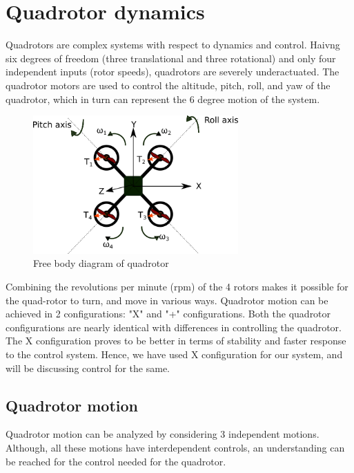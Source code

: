 \documentclass[hidelinks,BTech]{iitmdiss}
\begin{document}
\section{Quadrotor dynamics}
Quadrotors are complex systems with respect to dynamics and control. Haivng six degrees of freedom (three translational and three rotational) and only four independent inputs (rotor speeds), quadrotors are severely underactuated. The quadrotor motors are used to control the altitude, pitch, roll, and yaw of the quadrotor, which in turn can represent the 6 degree motion of the system.
\begin{figure}[H]
  \centering
    \includegraphics[width=0.7\textwidth]{Quadrotor_fbd.png}
    \caption{Free body diagram of quadrotor}
\end{figure}
Combining the revolutions per minute (rpm) of the 4 rotors makes it possible for the quad-rotor to turn, and move in various ways. Quadrotor motion can be achieved in 2 configurations: "X" and "+" configurations. Both the quadrotor configurations are nearly identical with differences in controlling the quadrotor. The X configuration proves to be better in terms of stability and faster response to the control system. Hence, we have used X configuration for our system, and will be discussing control for the same.

\subsection*{Quadrotor motion}
Quadrotor motion can be analyzed by considering 3 independent motions. Although, all these motions have interdependent controls, an understanding can be reached for the control needed for the quadrotor.
\end{document}

